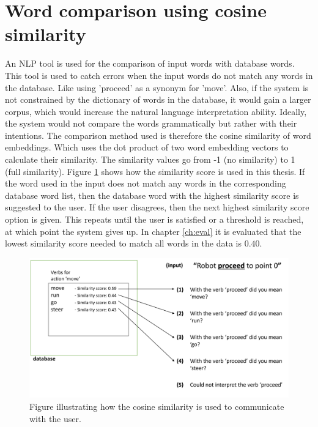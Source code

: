 \section{Word comparison using cosine similarity} \label{sec:comp_method}
An NLP tool is used for the comparison of input words with database words. This tool is used to catch errors when the input words do not match any words in the database. Like using 'proceed' as a synonym for 'move'. Also, if the system is not constrained by the dictionary of words in the database, it would gain a larger corpus, which would increase the natural language interpretation ability.
Ideally, the system would not compare the words grammatically but rather with their intentions.
The comparison method used is therefore the cosine similarity of word embeddings. Which uses the dot product of two word embedding vectors to calculate their similarity. The similarity values go from -1 (no similarity) to 1 (full similarity). Figure \ref{fig:cosine_similarity_example} shows how the similarity score is used in this thesis. If the word used in the input does not match any words in the corresponding database word list, then the database word with the highest similarity score is suggested to the user. If the user disagrees, then the next highest similarity score option is given. This repeats until the user is satisfied or a threshold is reached, at which point the system gives up.
In chapter \ref{ch:eval} it is evaluated that the lowest similarity score needed to match all words in the data is $0.40$.

\begin{figure}[ht]
    \centering
    \includegraphics[width=14cm]{img/Cosine_similarity_example.png}
    \caption{Figure illustrating how the cosine similarity is used to communicate with the user.}
    \label{fig:cosine_similarity_example}
\end{figure}

